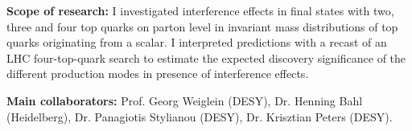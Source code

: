 \begin{cventries}
{\begin{cvitems}
    \item \textbf{Scope of research:} I investigated interference effects in final states with two, three and four top quarks on parton level in invariant mass distributions of top quarks originating from a scalar. I interpreted predictions with a recast of an LHC four-top-quark search to estimate the expected discovery significance of the different production modes in presence of interference effects.
    \item \textbf{Main collaborators:} Prof. Georg Weiglein (DESY), Dr. Henning Bahl (Heidelberg),
    Dr. Panagiotis Stylianou (DESY), Dr. Krisztian Peters (DESY).
  \end{cvitems}
}

\end{cventries}

